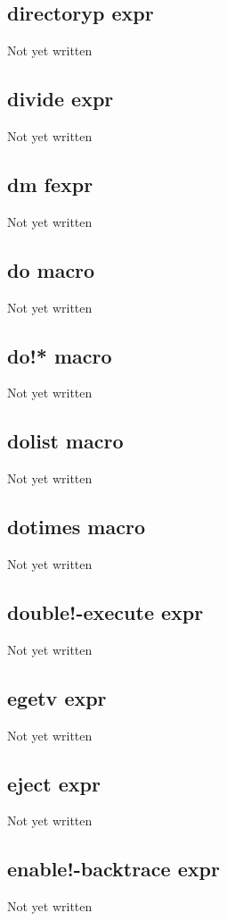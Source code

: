 \documentclass[a4paper,11pt]{article}
\begin{document}
{\subsection{\ttfamily directoryp expr}
Not yet written

\subsection{\ttfamily divide expr}
Not yet written

\subsection{\ttfamily dm fexpr}
Not yet written

\subsection{\ttfamily do macro}
Not yet written

\subsection{\ttfamily do!* macro}
Not yet written

\subsection{\ttfamily dolist macro}
Not yet written

\subsection{\ttfamily dotimes macro}
Not yet written

\subsection{\ttfamily double!-execute expr}
Not yet written

\subsection{\ttfamily egetv expr}
Not yet written

\subsection{\ttfamily eject expr}
Not yet written

\subsection{\ttfamily enable!-backtrace expr}
Not yet written

}
\end{document}
